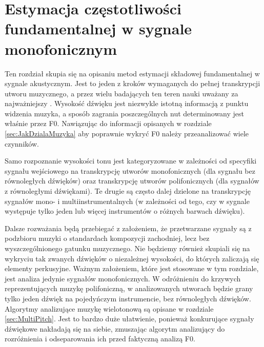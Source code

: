 \documentclass[12pt,a4paper,twoside]{mwart}
\begin{document}
\clearpage

\section{Estymacja częstotliwości fundamentalnej w sygnale monofonicznym}\label{sec:f0}
Ten rozdział skupia się na opisaniu metod estymacji składowej fundamentalnej w sygnale akustycznym. Jest to jeden z kroków wymaganych do pełnej transkrypcji utworu muzycznego, a przez wielu badających ten teren nauki uważany za najważniejszy 
\cite[408-415]{Transcription:Klapuri:ChallengesAndFuture}
. Wysokość dźwięku jest niezwykle istotną informacją z punktu widzenia muzyka, a sposób zagrania poszczególnych nut determinowany jest właśnie przez F0. Nawiązując do informacji opisanych w rozdziale \ref{sec:JakDzialaMuzyka} aby poprawnie wykryć F0 należy przeanalizować wiele czynników. 

Samo rozpoznanie wysokości tonu jest kategoryzowane w zależności od specyfiki sygnału wejściowego na transkrypcję utworów monofonicznych (dla sygnału bez równoległych dźwięków) oraz transkrypcję utworów polifonicznych (dla sygnałów z równoległymi dźwiękami). Te drugie są często dalej dzielone na transkrypcję sygnałów mono- i multiinstrumentalnych (w zależności od tego, czy w sygnale występuje tylko jeden lub więcej instrumentów o różnych barwach dźwięku).

Dalsze rozważania będą przebiegać z założeniem, że przetwarzane sygnały są z podzbioru muzyki o standardach kompozycji zachodniej, lecz bez wyszczególnionego gatunku muzycznego. Nie będziemy również skupiali się na wykryciu tak zwanych dźwięków o niezależnej wysokości, do których zaliczają się elementy perkusyjne. Ważnym założeniem, które jest stosowane w tym rozdziale, jest analiza jedynie sygnałów monofonicznych. W odróżnieniu do krzywych reprezentujących muzykę polifoniczną, w analizowanych utworach będzie grany tylko jeden dźwięk na pojedyńczym instrumencie, bez równoległych dźwięków. Algorytmy analizujące muzykę wielotonową są opisane w rozdziale \ref{sec:MultiPitch}. Jest to bardzo duże ułatwienie, ponieważ konkurujące sygnały dźwiękowe nakładają się na siebie, zmuszając algorytm analizujący do rozróżnienia i odseparowania ich przed faktyczną analizą F0. 
\end{document}
